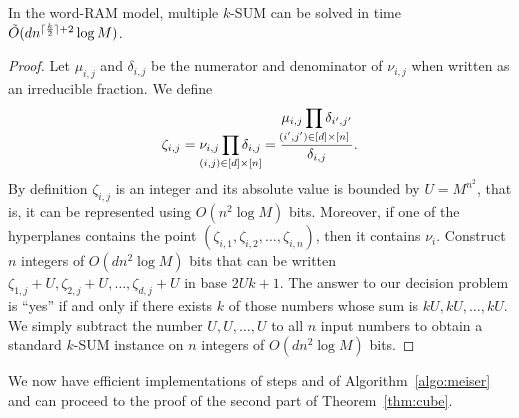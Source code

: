\begin{lemma}\label{lem:multiple}
	In the word-RAM model,
	multiple $k$-SUM can be solved in time $\tilde{O}(dn^{{\lceil\frac{k}{2} \rceil}+2}\log M)$.
\end{lemma}
\begin{proof}
	Let $\mu_{i,j}$ and $\delta_{i,j}$ be the numerator and denominator of
	$\nu_{i,j}$ when written as an irreducible fraction. We define
	$$
		\zeta_{i,j} = \nu_{i,j}\prod_{\mathclap{(i,j) \in [d]\times[n]}} \delta_{i,j} =
		\frac{\mu_{i,j}\displaystyle\prod_{\mathclap{(i',j') \in [d]\times[n]}} \delta_{i',j'}}{\delta_{i,j}}.
	$$
	By definition $\zeta_{i,j}$ is an integer and its absolute value is bounded
	by $U = M^{n^2}$, that is, it can be
	represented using $O(n^2 \log M)$ bits. Moreover, if one of the hyperplanes
	contains the point $(\zeta_{i,1},\zeta_{i,2},\ldots,\zeta_{i,n})$, then it
	contains $\nu_i$. Construct $n$ integers of $O(dn^2 \log M)$ bits that can
	be written $\zeta_{1,j}+U,\zeta_{2,j}+U,\ldots,\zeta_{d,j}+U$ in base
	$2Uk+1$. The answer to our decision problem is ``yes'' if and only if there
	exists $k$ of those numbers whose sum is $kU,kU,\ldots,kU$. We simply
	subtract the number $U,U,\ldots,U$ to all $n$
	input numbers to obtain a standard $k$-SUM instance on $n$ integers of
	$O(dn^2 \log M)$ bits.
\end{proof}

We now have efficient implementations of steps  and 
of Algorithm~\ref{algo:meiser} and can proceed to the proof of the second part
of Theorem~\ref{thm:cube}.

